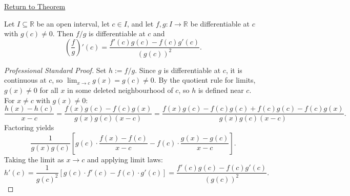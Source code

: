 \newpage
{}
\label{prf:quotient-rule}

\begin{remark*}[Return]
\hyperref[thm:quotient-rule]{Return to Theorem}
\end{remark*}

\begin{theorem*}
Let $I \subseteq \mathbb{R}$ be an open interval, let $c \in I$, and let
$f, g : I \to \mathbb{R}$ be differentiable at $c$ with $g(c) \neq 0$. Then
$f/g$ is differentiable at $c$ and
\[
  \left(\frac{f}{g}\right)'(c) = \frac{f'(c)g(c) - f(c)g'(c)}{(g(c))^2}.
\]
\end{theorem*}

\begin{proof}[Professional Standard Proof]
\LRAProofBodyStart
Set $h := f/g$. Since $g$ is differentiable at $c$, it is continuous at $c$, so $\lim_{x \to c} g(x) = g(c) \neq 0$. By the quotient rule for limits, $g(x) \neq 0$ for all $x$ in some deleted neighbourhood of $c$, so $h$ is defined near $c$. For $x \neq c$ with $g(x) \neq 0$:
\[
  \frac{h(x) - h(c)}{x - c}
  = \frac{f(x)g(c) - f(c)g(x)}{g(x)g(c)(x - c)}
  = \frac{f(x)g(c) - f(c)g(c) + f(c)g(c) - f(c)g(x)}{g(x)g(c)(x - c)}.
\]
Factoring yields
\[
  \frac{1}{g(x)g(c)}
    \left[
      g(c) \cdot \frac{f(x) - f(c)}{x - c}
      - f(c) \cdot \frac{g(x) - g(c)}{x - c}
    \right].
\]
Taking the limit as $x \to c$ and applying limit laws:
\[
  h'(c) = \frac{1}{g(c)^2}[g(c) \cdot f'(c) - f(c) \cdot g'(c)] = \frac{f'(c)g(c) - f(c)g'(c)}{(g(c))^2}.
\]
\end{proof}

